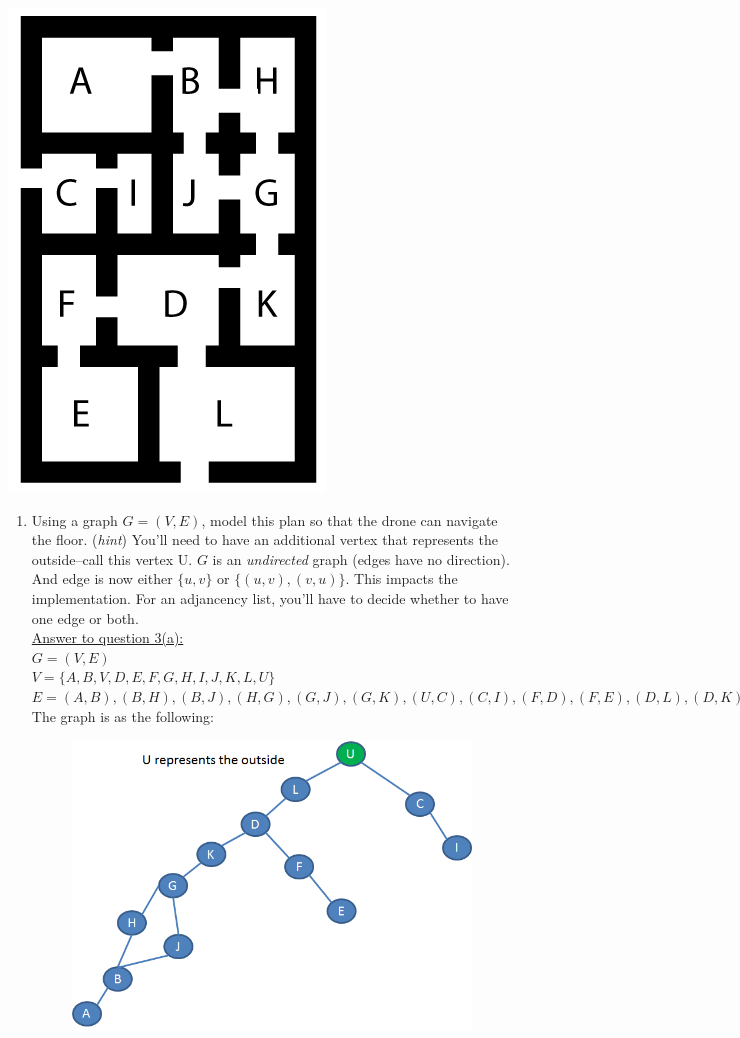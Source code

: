 \documentclass{article}
\begin{document}
\begin{enumerate}
\begin{center}
\includegraphics[scale=0.30]{maze55}
\end{center}
\begin{enumerate}
\item Using a graph $ G = (V,E)$, model this plan so that the drone can navigate the floor.  ({\it hint}) You'll need to have an additional vertex that represents the outside--call this vertex \textsf{U}.  $G$ is  an {\it undirected} graph (edges have no direction).  And edge is now either $\{u,v\}$ or $\{(u,v), (v,u)\}$.  This impacts the implementation.    For an adjancency list, you'll have to decide whether to have one edge or both. \\
\underline{Answer to question 3(a):}\\
$G=(V,E)$\\
$V=\{A,B,V,D,E,F,G,H,I,J,K,L,U\}$\\
$E={(A,B),(B,H),(B,J),(H,G),(G,J),(G,K),(U,C),(C,I),(F,D),(F,E),(D,L),(D,K),(L,U)}$\\
The graph is as the following:\\
\begin{figure}[h]
\includegraphics[width=0.5\columnwidth]{graphp3}\centering 

\end{figure}
\end{enumerate}
\end{enumerate}
\end{document}
